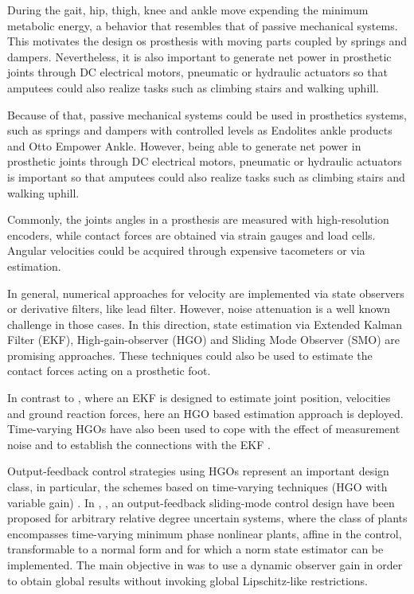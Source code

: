 \documentclass[letterpaper, 10 pt, conference]{ieeeconf}  %
\theoremstyle{plain}
\theoremstyle{definition}
\theoremstyle{remark}
\begin{document}
During the gait, hip, thigh, knee and ankle move expending the minimum metabolic energy, a behavior that resembles that of passive mechanical systems. This motivates the design os prosthesis with moving parts coupled by springs and dampers. Nevertheless, it is also important to generate net power in prosthetic joints through DC electrical motors, pneumatic or hydraulic actuators \cite{Goldfarb2008} \cite{Bedard2002} so that amputees could also realize tasks such as climbing stairs and walking uphill.

Because of that, passive mechanical systems could be used in prosthetics systems, such as springs and dampers with controlled levels as Endolites ankle products and Otto Empower Ankle. However, being able to generate net power in prosthetic joints through DC electrical motors, pneumatic or hydraulic actuators \cite{Goldfarb2008} \cite{Bedard2002} is important so that amputees could also realize tasks such as climbing stairs and walking uphill.

Commonly, the joints angles in a prosthesis are measured with high-resolution encoders, while contact forces are obtained via strain gauges and load cells. Angular velocities could be acquired through expensive tacometers or via estimation. 

In general, numerical approaches for velocity are implemented via state observers or derivative filters, like lead filter. However,  noise attenuation  is a well known challenge in those cases. In this direction, state estimation via Extended Kalman Filter (EKF), High-gain-observer (HGO) and Sliding Mode Observer (SMO) are promising approaches. These techniques could also be used to estimate the contact forces acting on a prosthetic foot.

In contrast to \cite{Fakoorian2016}, where an EKF is designed to estimate joint position, velocities and ground reaction forces, here an HGO based estimation approach is deployed. Time-varying HGOs have also been used to cope with the effect of measurement noise and to establish the connections with the EKF \cite{AK:07} \cite{AK:09}. 

Output-feedback control strategies using HGOs \cite{OK:97} represent an important design class, in particular, the schemes based on time-varying techniques (HGO with variable gain) \cite{P:01}\cite{KKJ:02} \cite{KKC:03}\cite{LL:05}\cite{AK:07}. In \cite{POH:2011}, \cite{PHCL:2007}, an output-feedback sliding-mode control design have been proposed for arbitrary relative degree uncertain systems, where the class of plants encompasses time-varying minimum phase nonlinear plants, affine in the control, transformable to a normal form and for which a norm state estimator can be implemented. The main objective in \cite{POH:2011} was to use a dynamic observer gain in order to obtain global results without invoking global Lipschitz-like restrictions. 
\end{document}
